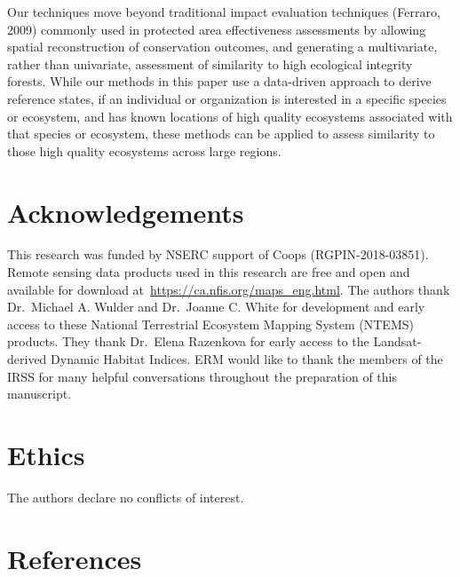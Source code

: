 \documentclass[
]{agujournal2019}
\begin{document}
Our techniques move beyond traditional impact evaluation techniques
(Ferraro, 2009) commonly used in protected area effectiveness
assessments by allowing spatial reconstruction of conservation outcomes,
and generating a multivariate, rather than univariate, assessment of
similarity to high ecological integrity forests. While our methods in
this paper use a data-driven approach to derive reference states, if an
individual or organization is interested in a specific species or
ecosystem, and has known locations of high quality ecosystems associated
with that species or ecosystem, these methods can be applied to assess
similarity to those high quality ecosystems across large regions.

\section{Acknowledgements}\label{acknowledgements}

This research was funded by NSERC support of Coops (RGPIN-2018-03851).
Remote sensing data products used in this research are free and open and
available for download at~\url{https://ca.nfis.org/maps_eng.html}. The
authors thank Dr.~Michael A. Wulder and Dr.~Joanne C. White for
development and early access to these National Terrestrial Ecosystem
Mapping System (NTEMS) products. They thank Dr.~Elena Razenkova for
early access to the Landsat-derived Dynamic Habitat Indices. ERM would
like to thank the members of the IRSS for many helpful conversations
throughout the preparation of this manuscript.

\section{Ethics}\label{ethics}

The authors declare no conflicts of interest.

\section*{References}\label{references}
\end{document}

